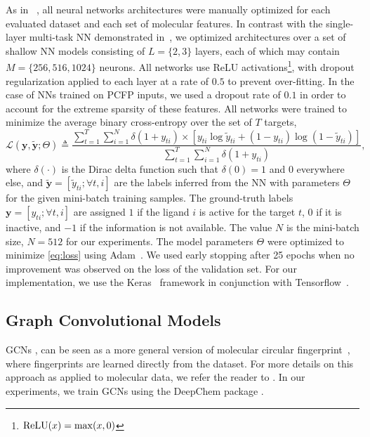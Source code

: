 \documentclass[11pt,a4paper]{article}
\begin{document}
As in ~\cite{Mayr:2016aa}, all neural networks architectures were manually 
optimized for each evaluated dataset and each set of molecular features.
In contrast with the single-layer multi-task NN demonstrated in~\cite{Duvenaud:2015aa},
we optimized architectures over a set of shallow NN models 
consisting of $L = \{2, 3\}$ layers, each of which may contain 
$M = \{256, 516, 1024\}$ neurons. 
All networks use ReLU activations\footnote{${\rm ReLU}(x) = \max(x,0)$}, 
with dropout regularization applied to each layer at a rate of $0.5$ to
prevent over-fitting.
In the case of NNs trained on PCFP inputs, we used a dropout rate of $0.1$
in order to account for the extreme sparsity of these features.
All networks were trained to minimize the average binary cross-entropy 
over the set of $T$ targets,
\begin{equation}
\mathcal{L}(\mathbf{y}, \widetilde{\mathbf{y}}; \Theta) \triangleq
\frac
{\sum_{t=1}^{T} \sum_{i=1}^{N} \delta(1 + y_{ti}) \times
\left[ y_{ti} \log \widetilde{y}_{ti} + (1-y_{ti})\log(1-\widetilde{y}_{ti})\right]}
{\sum_{t=1}^{T} \sum_{i=1}^{N} \delta(1 + y_{ti})},
\label{eq:loss}
\end{equation}
where $\delta(\cdot)$ is the Dirac delta function such that $\delta(0) = 1$ and $0$ everywhere 
else, and $\widetilde{\mathbf{y}}=[\widetilde{y}_{ti}; \forall t, i ]$ are the labels inferred
from the NN with parameters $\Theta$ for the given mini-batch training samples. 
The ground-truth labels $\mathbf{y} = [y_{ti}; \forall t, i ]$ are assigned $1$ if the ligand $i$ 
is active for the target $t$, $0$ if it is inactive, and $-1$ if the information is not available. 
The value $N$ is the mini-batch size, $N = 512$ for our experiments. 
The model parameters $\Theta$ were optimized to minimize 
\eqref{eq:loss} using Adam~\cite{KB2014}. 
We used early stopping after 25 epochs when no improvement was observed on the 
loss of the validation set. For our implementation, we use the
Keras~\cite{Cho2015} framework in conjunction with 
Tensorflow~\cite{tensorflow2015-whitepaper}.

\subsection{Graph Convolutional Models}
GCNs \cite{Duvenaud:2015aa}, 
can be seen as a more general version of molecular circular
fingerprint~\cite{Glen:2006ab}, where fingerprints are learned directly from 
the dataset. For more details on this approach as applied to molecular data, 
we refer the reader to \cite{Wu:2017, Duvenaud:2015aa}. In our experiments, we
train GCNs using the DeepChem package \cite{Wu:2017}.
\end{document}
